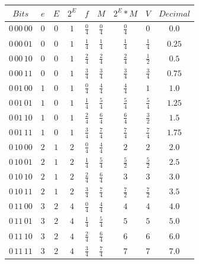 \documentclass{article}
\begin{document}
\begin{flushleft}
        \bigskip
        \begin{tabular}{ccccccccc}
        $Bits$  & $e$   & $E$   & $2^E$ & $f$   & $M$   & $2^E \ast M$ & $V$    & $Decimal$\\
        \midrule
        $0\,00\,00$   &  $0$ & $0$ & $1$ & $\frac{0}{4}$ & $\frac{0}{4}$ & $\frac{0}{4}$ & $0$ & $0.0$\\
        $0\,00\,01$   &  $0$ & $0$ & $1$ & $\frac{1}{4}$ & $\frac{1}{4}$ & $\frac{1}{4}$ & $\frac{1}{4}$ & $0.25$\\
        $0\,00\,10$   &  $0$ & $0$ & $1$ & $\frac{2}{4}$ & $\frac{2}{4}$ & $\frac{2}{4}$ & $\frac{1}{2}$ & $0.5$\\
        $0\,00\,11$   &  $0$ & $0$ & $1$ & $\frac{3}{4}$ & $\frac{3}{4}$ & $\frac{3}{4}$ & $\frac{3}{4}$ & $0.75$\\
        $0\,01\,00$   &  $1$ & $0$ & $1$ & $\frac{0}{4}$ & $\frac{4}{4}$ & $\frac{4}{4}$ & $1$ & $1.0$\\
        $0\,01\,01$   &  $1$ & $0$ & $1$ & $\frac{1}{4}$ & $\frac{5}{4}$ & $\frac{5}{4}$ & $\frac{5}{4}$ & $1.25$\\
        $0\,01\,10$   &  $1$ & $0$ & $1$ & $\frac{2}{4}$ & $\frac{6}{4}$ & $\frac{6}{4}$ & $\frac{3}{2}$ & $1.5$\\
        $0\,01\,11$   &  $1$ & $0$ & $1$ & $\frac{3}{4}$ & $\frac{7}{4}$ & $\frac{7}{4}$ & $\frac{7}{4}$ & $1.75$\\
        $0\,10\,00$   &  $2$ & $1$ & $2$ & $\frac{0}{4}$ & $\frac{4}{4}$ & $2$ & $2$ & $2.0$\\
        $0\,10\,01$   &  $2$ & $1$ & $2$ & $\frac{1}{4}$ & $\frac{5}{4}$ & $\frac{5}{2}$ & $\frac{5}{2}$ & $2.5$\\
        $0\,10\,10$   &  $2$ & $1$ & $2$ & $\frac{2}{4}$ & $\frac{6}{4}$ & $3$ & $3$ & $3.0$\\
        $0\,10\,11$   &  $2$ & $1$ & $2$ & $\frac{3}{4}$ & $\frac{7}{4}$ & $\frac{7}{2}$ & $\frac{7}{2}$ & $3.5$\\
        $0\,11\,00$   &  $3$ & $2$ & $4$ & $\frac{0}{4}$ & $\frac{4}{4}$ & $4$ & $4$ & $4.0$\\
        $0\,11\,01$   &  $3$ & $2$ & $4$ & $\frac{1}{4}$ & $\frac{5}{4}$ & $5$ & $5$ & $5.0$\\
        $0\,11\,10$   &  $3$ & $2$ & $4$ & $\frac{2}{4}$ & $\frac{6}{4}$ & $6$ & $6$ & $6.0$\\
        $0\,11\,11$   &  $3$ & $2$ & $4$ & $\frac{3}{4}$ & $\frac{7}{4}$ & $7$ & $7$ & $7.0$\\
\end{tabular}
    \end{flushleft}
\end{document}
